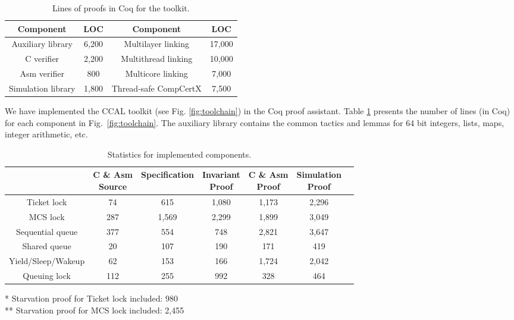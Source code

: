 \begin{table}
\begin{center}
\begin{footnotesize}
\renewcommand{\arraystretch}{1} 
\begin{tabular}{|c|c||c|c|}
\hline
Component & LOC & Component & LOC \\
\hline
\hline
Auxiliary library & 6,200 & Multilayer linking & 17,000 \\
\hline
C verifier & 2,200 & Multithread linking & 10,000 \\
\hline
Asm verifier & 800 & Multicore linking & 7,000 \\
\hline
Simulation library & 1,800 & Thread-safe CompCertX & 7,500\\
\hline
\end{tabular}
\end{footnotesize}
\end{center}
\caption{Lines of proofs in Coq for the toolkit.}
\label{table:toolkit}
\end{table}

We have implemented the CCAL toolkit (see Fig. \ref{fig:toolchain}) in the Coq proof assistant. 
Table
\ref{table:toolkit} presents the number of lines (in Coq) for each component in Fig.~\ref{fig:toolchain}. The auxiliary library contains the common
tactics and lemmas for 64 bit integers, lists, maps, integer
arithmetic, {etc}.

\begin{table}
\begin{center}
\renewcommand{\arraystretch}{1.1}
\setlength{\tabcolsep}{0.3em}
\begin{tabular}{|c|c|c|c|c|c|c|}
\hline
 & \makecell{ C \& Asm \\Source} & Specification & \makecell{Invariant \\ Proof} & \makecell{C \& Asm \\Proof} & \makecell{Simulation \\ Proof} \\
\hline
Ticket lock & 74 & 615 & 1,080 & 1,173 & 2,296 \\
\hline
MCS lock & 287 & 1,569 & 2,299  &  1,899 & 3,049 \\
\hline
Sequential queue & 377 & 554 & 748 & 2,821& 3,647 \\
\hline
Shared queue &  20 & 107 & 190 & 171& 419\\
\hline
Yield/Sleep/Wakeup & 62 & 153 & 166 & 1,724 & 2,042 \\
\hline
Queuing lock & 112 & 255 & 992 & 328 & 464\\
\hline
\end{tabular}
\newline
\end{center}
\begin{flushright}
* Starvation proof for Ticket lock included: 980\\
** Starvation proof for MCS lock included: 2,455
\end{flushright}
\caption{Statistics for implemented components.}
\label{table:evaluation}
\hrulefill
\end{table}

